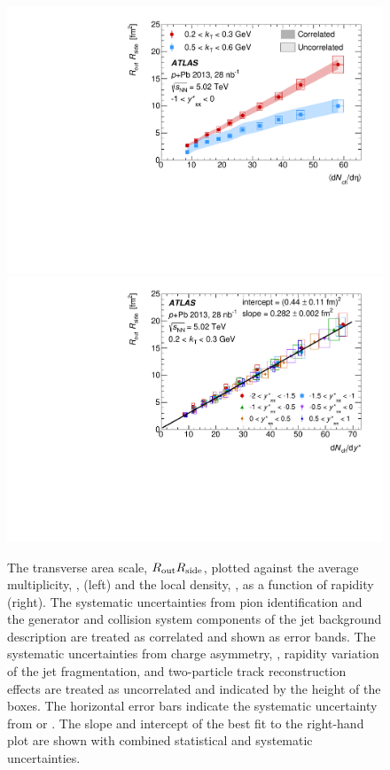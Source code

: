 \FloatBarrier

\begin{figure}[t]
\centering
\includegraphics[width=0.49\linewidth]{canqosl_detRt_vs_avg_mult.pdf}
\includegraphics[width=0.49\linewidth]{canqosl_detRt_kt1_vs_mult.pdf}
\caption{The transverse area scale, $R_{\mathrm{out}}R_{\mathrm{side}}$, plotted against the average multiplicity, \avgdNdeta, (left) and the local density, \dNdy, as a function of rapidity (right). The systematic uncertainties from pion identification and the generator and collision system components of the jet background description are treated as correlated and shown as error bands. The systematic uncertainties from charge asymmetry, \Reff, rapidity variation of the jet fragmentation, and two-particle track reconstruction effects are treated as uncorrelated and indicated by the height of the boxes. The horizontal error bars indicate the systematic uncertainty from \avgdNdeta or \dNdy. The slope and intercept of the best fit to the right-hand plot are shown with combined statistical and systematic uncertainties.}
\label{fig:results_detRt_mult}
\end{figure}

